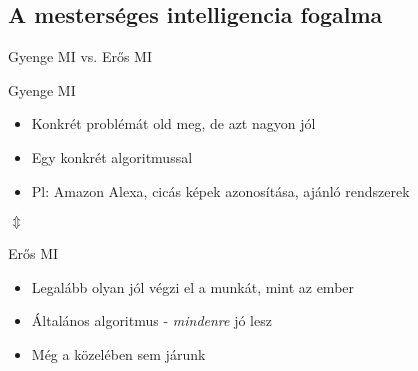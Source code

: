 \subsection{A mesterséges intelligencia fogalma}
\begin{frame}{Gyenge MI vs. Erős MI}
    \begin{block}{Gyenge MI}
        \begin{itemize}
                \item Konkrét problémát old meg, de azt nagyon jól
                \item Egy konkrét algoritmussal
                \item Pl: Amazon Alexa, cicás képek azonosítása, ajánló rendszerek
            \end{itemize}
    \end{block}
    \centering\LARGE{$\Updownarrow$}
    \normalsize
    \begin{block}{Erős MI}
        \begin{itemize}
            \item Legalább olyan jól végzi el a munkát, mint az ember
            \item Általános algoritmus - {\it mindenre} jó lesz
            \item Még a közelében sem járunk
        \end{itemize}
    \end{block}
\end{frame}

